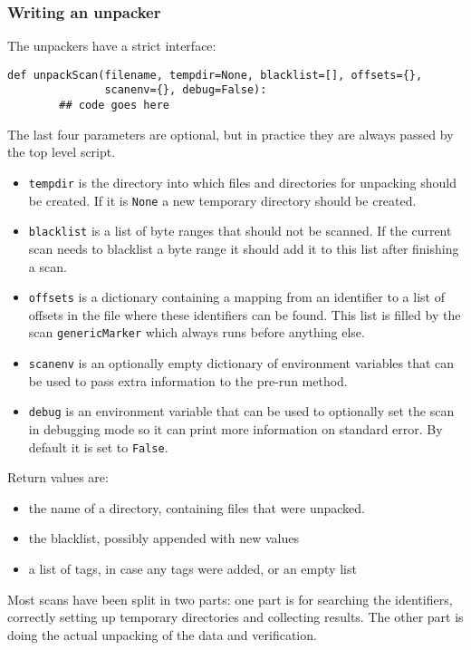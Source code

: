 \documentclass[10pt,a4paper]{article}
\begin{document}
\subsubsection{Writing an unpacker}

The unpackers have a strict interface:

\begin{verbatim}
def unpackScan(filename, tempdir=None, blacklist=[], offsets={},
               scanenv={}, debug=False):
        ## code goes here
\end{verbatim}

The last four parameters are optional, but in practice they are always passed
by the top level script.

\begin{itemize}
\item \texttt{tempdir} is the directory into which files and directories for
unpacking should be created. If it is \texttt{None} a new temporary directory
should be created.
\item \texttt{blacklist} is a list of byte ranges that should not be scanned.
If the current scan needs to blacklist a byte range it should add it to this
list after finishing a scan.
\item \texttt{offsets} is a dictionary containing a mapping from an identifier
to a list of offsets in the file where these identifiers can be found. This
list is filled by the scan \texttt{genericMarker} which always runs before
anything else.
\item \texttt{scanenv} is an optionally empty dictionary of environment variables
that can be used to pass extra information to the pre-run method.
\item \texttt{debug} is an environment variable that can be used to optionally
set the scan in debugging mode so it can print more information on standard
error. By default it is set to \texttt{False}.
\end{itemize}

Return values are:

\begin{itemize}
\item the name of a directory, containing files that were unpacked.
\item the blacklist, possibly appended with new values
\item a list of tags, in case any tags were added, or an empty list
\end{itemize}

Most scans have been split in two parts: one part is for searching the
identifiers, correctly setting up temporary directories and collecting results.
The other part is doing the actual unpacking of the data and verification.
\end{document}
